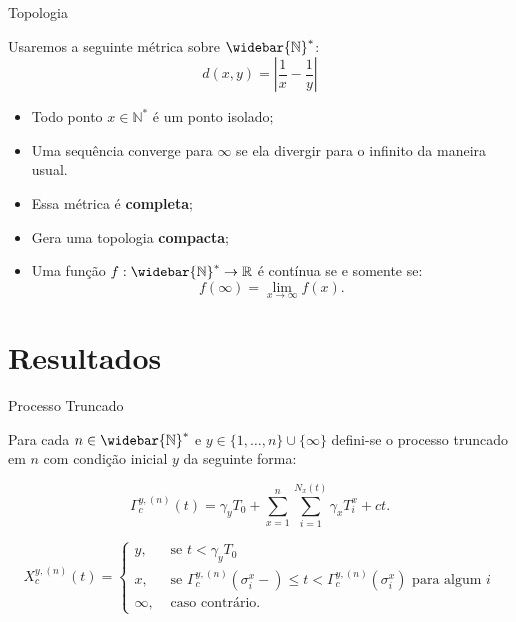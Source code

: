 \documentclass[xcolor=pdftex,dvipsnames]{beamer}
\newcommand{\Nz}{{\mathbb{N^*}}}
\newcommand{\Nzb}{{\mathbb{\widebar{N}^*}}}
\newcommand{\R}{{\mathbb{R}}}
\begin{document}
\begin{frame}{Topologia}
  
  Usaremos a seguinte métrica sobre $\Nzb$:
  \begin{displaymath}
    d(x, y) = \left\lvert \frac{1}{x} - \frac{1}{y} \right\rvert
  \end{displaymath}


  \begin{itemize}
  \item<2-> Todo ponto $x \in \Nz$ é um ponto isolado;
  \item<3-> Uma sequência converge para $\infty$ se ela divergir para o
    infinito da maneira usual.
  \item<4-> Essa métrica é {\bf completa};
  \item<5-> Gera uma topologia {\bf compacta};
  \item<6-> Uma função $f: \Nzb \to \R$ é contínua se e somente se:
    \begin{displaymath}
      f(\infty) = \lim_{x \to \infty} f(x) .
    \end{displaymath}
  \end{itemize}

\end{frame}

\section{Resultados}

\begin{frame}{Processo Truncado}

  Para cada $n \in \Nzb$  e $y \in \{ 1, \ldots, n\} \cup \{ \infty
  \}$ defini-se o processo truncado em $n$ com condição inicial $y$ da
  seguinte forma:


\begin{displaymath}
  \Gamma^{y,(n)}_c (t) = \gamma_y T_0
  + \sum_{x =1}^{n} \sum_{i = 1}^{N_x(t)}
  \gamma_x T_i^x
  + c t.
\end{displaymath}

\begin{displaymath}
   X^{y,(n)}_c(t) = \begin{cases}
    y, & \textrm{ se }  t < \gamma_y T_0 \\
    x, & \textrm{ se } \Gamma^{y,(n)}_c(\sigma_i^x-) \leq t <
    \Gamma^{y,(n)}_c(\sigma^x_i)
    \text{ para algum } i \\
    \infty, & \textrm{ caso contrário.}
  \end{cases}
\end{displaymath}
\end{frame}
\end{document}
